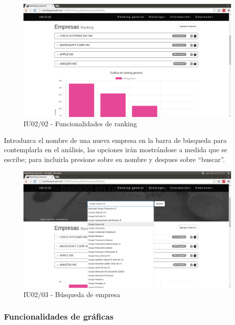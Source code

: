     \begin{figure}[H]
        \begin{center}
            \includegraphics[scale=0.3]{pantallas/Ranking2}
            \caption{IU02/02 - Funcionalidades de ranking}
        \end{center}
    \end{figure}

    Introduzca el nombre de una nueva empresa en la barra de búsqueda para contemplarla en el análisis,
    las opciones irán mostrándose a medida que se escribe; para incluirla presione sobre su nombre 
    y despues sobre ``buscar''.

    \begin{figure}[H]
        \begin{center}
            \includegraphics[scale=0.3]{pantallas/Ranking3}
            \caption{IU02/03 - Búsqueda de empresa}
        \end{center}
    \end{figure}


    \subsubsection{Funcionalidades de gráficas}


